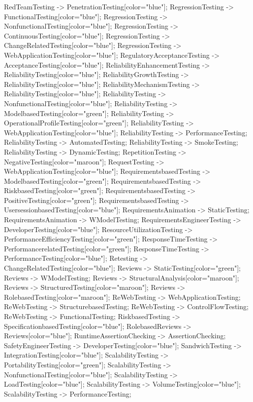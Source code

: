 \documentclass{article}
\begin{document}
{RedTeamTesting -> PenetrationTesting[color="blue"];
RegressionTesting -> FunctionalTesting[color="blue"];
RegressionTesting -> NonfunctionalTesting[color="blue"];
RegressionTesting -> ContinuousTesting[color="blue"];
RegressionTesting -> ChangeRelatedTesting[color="blue"];
RegressionTesting -> WebApplicationTesting[color="blue"];
RegulatoryAcceptanceTesting -> AcceptanceTesting[color="blue"];
ReliabilityEnhancementTesting -> ReliabilityTesting[color="blue"];
ReliabilityGrowthTesting -> ReliabilityTesting[color="blue"];
ReliabilityMechanismTesting -> ReliabilityTesting[color="blue"];
ReliabilityTesting -> NonfunctionalTesting[color="blue"];
ReliabilityTesting -> ModelbasedTesting[color="green"];
ReliabilityTesting -> OperationalProfileTesting[color="green"];
ReliabilityTesting -> WebApplicationTesting[color="blue"];
ReliabilityTesting -> PerformanceTesting;
ReliabilityTesting -> AutomatedTesting;
ReliabilityTesting -> SmokeTesting;
ReliabilityTesting -> DynamicTesting;
RepetitionTesting -> NegativeTesting[color="maroon"];
RequestTesting -> WebApplicationTesting[color="blue"];
RequirementsbasedTesting -> ModelbasedTesting[color="green"];
RequirementsbasedTesting -> RiskbasedTesting[color="green"];
RequirementsbasedTesting -> PositiveTesting[color="green"];
RequirementsbasedTesting -> UsersessionbasedTesting[color="blue"];
RequirementsAnimation -> StaticTesting;
RequirementsAnimation -> WModelTesting;
RequirementsEngineerTesting -> DeveloperTesting[color="blue"];
ResourceUtilizationTesting -> PerformanceEfficiencyTesting[color="green"];
ResponseTimeTesting -> PerformancerelatedTesting[color="green"];
ResponseTimeTesting -> PerformanceTesting[color="blue"];
Retesting -> ChangeRelatedTesting[color="blue"];
Reviews -> StaticTesting[color="green"];
Reviews -> WModelTesting;
Reviews -> StructuralAnalysis[color="maroon"];
Reviews -> StructuredTesting[color="maroon"];
Reviews -> RolebasedTesting[color="maroon"];
ReWebTesting -> WebApplicationTesting;
ReWebTesting -> StructurebasedTesting;
ReWebTesting -> ControlFlowTesting;
ReWebTesting -> FunctionalTesting;
RiskbasedTesting -> SpecificationbasedTesting[color="blue"];
RolebasedReviews -> Reviews[color="blue"];
RuntimeAssertionChecking -> AssertionChecking;
SafetyEngineerTesting -> DeveloperTesting[color="blue"];
SandwichTesting -> IntegrationTesting[color="blue"];
ScalabilityTesting -> PortabilityTesting[color="green"];
ScalabilityTesting -> NonfunctionalTesting[color="blue"];
ScalabilityTesting -> LoadTesting[color="blue"];
ScalabilityTesting -> VolumeTesting[color="blue"];
ScalabilityTesting -> PerformanceTesting;
}
\end{document}
